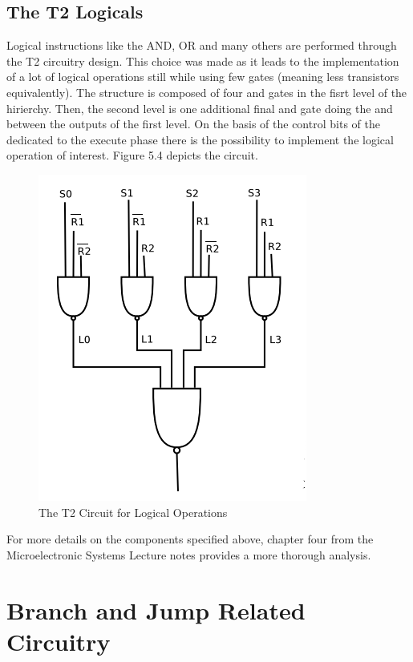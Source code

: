     \subsection{ The T2 Logicals }

    Logical instructions like the AND, OR and many others are performed through the T2 circuitry design. This choice was made as it leads
    to the implementation of a lot of logical operations still while using few gates (meaning less transistors equivalently). The structure is composed
    of four and gates in the fisrt level of the hirierchy. Then, the second level is one additional final and gate doing the and between the outputs of the first level.
    On the basis of the control bits of the dedicated to the execute phase there is the possibility to implement the logical operation of interest.
    Figure 5.4 depicts the circuit.

    \begin{figure}[h!]
        \centering
        \includegraphics[scale = .6]
        {chapters/figures/T2Logic}
        \caption{The T2 Circuit for Logical Operations}
        \label{fig:T2Logic}
        \end{figure}

    For more details on the components specified above, chapter four from the Microelectronic Systems Lecture notes provides a more thorough analysis.
\newpage

\section{ Branch and Jump Related Circuitry }

